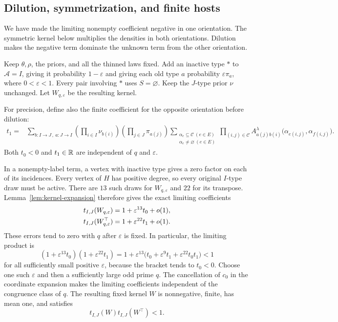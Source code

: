 \subsection{Dilution, symmetrization, and finite hosts}

We have made the limiting nonempty coefficient negative in one
orientation. The symmetric kernel below multiplies the densities in
both orientations. Dilution makes the negative term dominate the
unknown term from the other orientation.

Keep $\theta,\rho$, the priors, and all the thinned laws fixed. Add
an inactive type $*$ to $\mathcal A=I$, giving it probability
$1-\varepsilon$ and giving each old type $a$ probability
$\varepsilon\pi_a$, where $0<\varepsilon<1$. Every pair involving
$*$ uses $S=\varnothing$. Keep the $J$-type prior $\nu$ unchanged.
Let $W_{q,\varepsilon}$ be the resulting kernel.

For precision, define also the finite coefficient for the opposite
orientation before dilution:
\begin{align}
 t_1={}&\sum_{b:I\to J\,,\ a:J\to I}
       \left(\prod_{i\in I}\nu_{b(i)}\right)
       \left(\prod_{j\in J}\pi_{a(j)}\right)
       \sum_{\substack{\alpha_e\subseteq\mathscr C\ (e\in E)\\
                       \alpha_e\ne\varnothing\ (e\in E)}}
       \prod_{(i,j)\in\mathscr C}
       A^\lambda_{a(j)b(i)}
         \bigl(\alpha_{e(i,j)},\alpha_{f(i,j)}\bigr).
 \label{eq:kernel-transpose-coefficient}
\end{align}
Both $t_0<0$ and $t_1\in\mathbb R$ are independent of $q$ and
$\varepsilon$.

In a nonempty-label term, a vertex with inactive type gives a zero
factor on each of its incidences. Every vertex of $H$ has positive
degree, so every original $I$-type draw must be active. There are
$13$ such draws for $W_{q,\varepsilon}$ and $22$ for its transpose.
Lemma~\ref{lem:kernel-expansion} therefore gives the exact limiting
coefficients
\begin{align}
 t_{I,J}(W_{q,\varepsilon})
   &=1+\varepsilon^{13}t_0+o(1),\notag\\
 t_{I,J}(W_{q,\varepsilon}^\top)
   &=1+\varepsilon^{22}t_1+o(1).
 \label{eq:kernel-dilution}
\end{align}
These errors tend to zero with $q$ after $\varepsilon$ is fixed.
In particular, the limiting product is
\begin{equation}
 (1+\varepsilon^{13}t_0)(1+\varepsilon^{22}t_1)
 =1+\varepsilon^{13}
      \bigl(t_0+\varepsilon^9t_1+\varepsilon^{22}t_0t_1\bigr)<1
 \label{eq:kernel-product-gap}
\end{equation}
for all sufficiently small positive $\varepsilon$, because the
bracket tends to $t_0<0$. Choose one such $\varepsilon$ and then a
sufficiently large odd prime $q$. The cancellation of $c_0$ in the
coordinate expansion makes the limiting coefficients independent of
the congruence class of $q$. The resulting fixed kernel $W$ is
nonnegative, finite, has mean one, and satisfies
\begin{equation}
 t_{I,J}(W)t_{I,J}(W^\top)<1.
 \label{eq:kernel-oriented-gap}
\end{equation}

